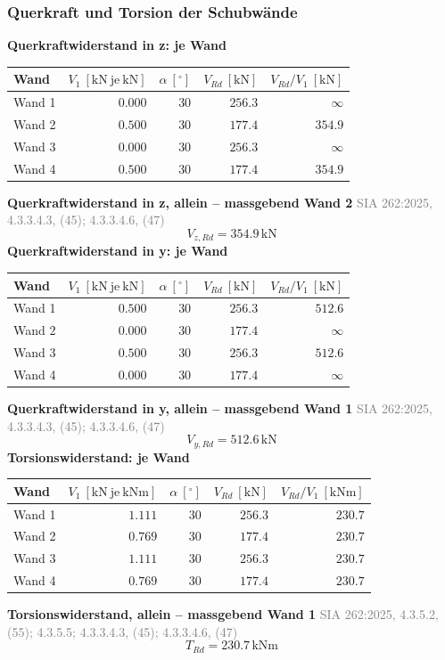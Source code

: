 \documentclass[11pt,a4paper]{article}
\newcommand{\normref}[1]{{\small\textcolor{gray}{#1}}}
\begin{document}
\subsubsection{Querkraft und Torsion der Schubwände}
\noindent\textbf{Querkraftwiderstand in z: je Wand}
\begin{longtable}{lrrrr}
\hline
Wand & $V_1\ [\mathrm{kN}\ \text{je}\ \mathrm{kN}]$ & $\alpha\ [{}^{\circ}]$ & $V_{Rd}\ [\mathrm{kN}]$ & $V_{Rd}/V_1\ [\mathrm{kN}]$ \\
\hline
\endhead
Wand 1 & $0.000$ & $30$ & $256.3$ & $\infty$ \\
Wand 2 & $0.500$ & $30$ & $177.4$ & $354.9$ \\
Wand 3 & $0.000$ & $30$ & $256.3$ & $\infty$ \\
Wand 4 & $0.500$ & $30$ & $177.4$ & $354.9$ \\
\hline
\end{longtable}
\noindent\textbf{Querkraftwiderstand in z, allein – massgebend Wand 2} \hfill \normref{SIA 262:2025, 4.3.3.4.3, (45); 4.3.3.4.6, (47)}
\begin{equation*}
V_{z,Rd} = 354.9\,\mathrm{kN}
\end{equation*}
\noindent\textbf{Querkraftwiderstand in y: je Wand}
\begin{longtable}{lrrrr}
\hline
Wand & $V_1\ [\mathrm{kN}\ \text{je}\ \mathrm{kN}]$ & $\alpha\ [{}^{\circ}]$ & $V_{Rd}\ [\mathrm{kN}]$ & $V_{Rd}/V_1\ [\mathrm{kN}]$ \\
\hline
\endhead
Wand 1 & $0.500$ & $30$ & $256.3$ & $512.6$ \\
Wand 2 & $0.000$ & $30$ & $177.4$ & $\infty$ \\
Wand 3 & $0.500$ & $30$ & $256.3$ & $512.6$ \\
Wand 4 & $0.000$ & $30$ & $177.4$ & $\infty$ \\
\hline
\end{longtable}
\noindent\textbf{Querkraftwiderstand in y, allein – massgebend Wand 1} \hfill \normref{SIA 262:2025, 4.3.3.4.3, (45); 4.3.3.4.6, (47)}
\begin{equation*}
V_{y,Rd} = 512.6\,\mathrm{kN}
\end{equation*}
\noindent\textbf{Torsionswiderstand: je Wand}
\begin{longtable}{lrrrr}
\hline
Wand & $V_1\ [\mathrm{kN}\ \text{je}\ \mathrm{kNm}]$ & $\alpha\ [{}^{\circ}]$ & $V_{Rd}\ [\mathrm{kN}]$ & $V_{Rd}/V_1\ [\mathrm{kNm}]$ \\
\hline
\endhead
Wand 1 & $1.111$ & $30$ & $256.3$ & $230.7$ \\
Wand 2 & $0.769$ & $30$ & $177.4$ & $230.7$ \\
Wand 3 & $1.111$ & $30$ & $256.3$ & $230.7$ \\
Wand 4 & $0.769$ & $30$ & $177.4$ & $230.7$ \\
\hline
\end{longtable}
\noindent\textbf{Torsionswiderstand, allein – massgebend Wand 1} \hfill \normref{SIA 262:2025, 4.3.5.2, (55); 4.3.5.5; 4.3.3.4.3, (45); 4.3.3.4.6, (47)}
\begin{equation*}
T_{Rd} = 230.7\,\mathrm{kNm}
\end{equation*}
\end{document}

